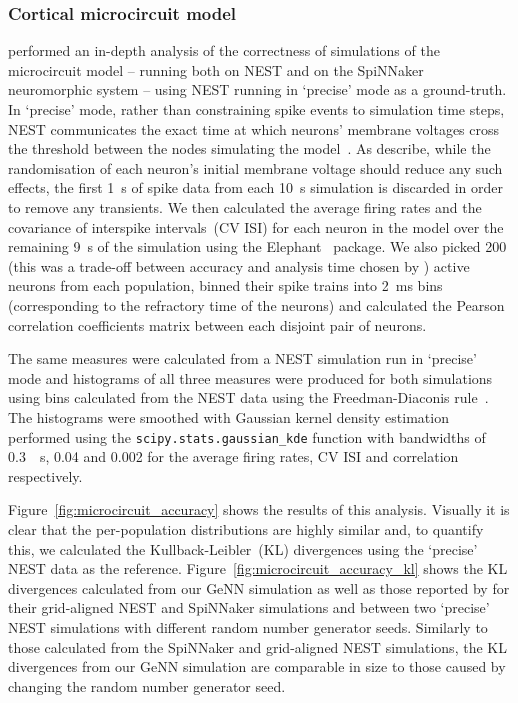 \documentclass[utf8]{frontiersSCNS} %
\begin{document}
\subsubsection{Cortical microcircuit model}
\citet{VanAlbada2018} performed an in-depth analysis of the correctness of simulations of the microcircuit model -- running both on NEST and on the SpiNNaker neuromorphic system -- using NEST running in `precise' mode as a ground-truth.
In `precise' mode, rather than constraining spike events to simulation time steps, NEST communicates the exact time at which neurons' membrane voltages cross the threshold between the nodes simulating the model~\citep{Hanuschkin2010}.
As \citeauthor{VanAlbada2018} describe, while the randomisation of each neuron's initial membrane voltage should reduce any such effects, the first \SI{1}{\second} of spike data from each \SI{10}{\second} simulation is discarded in order to remove any transients.
We then calculated the average firing rates and the covariance of interspike intervals~(CV ISI) for each neuron in the model over the remaining \SI{9}{\second} of the simulation using the Elephant~\citep{Yegenoglu2018} package.
We also picked \num{200} (this was a trade-off between accuracy and analysis time chosen by \citeauthor{VanAlbada2018}) active neurons from each population, binned their spike trains into \SI{2}{\milli\second} bins (corresponding to the refractory time of the neurons) and calculated the Pearson correlation coefficients matrix between each disjoint pair of neurons.

The same measures were calculated from a NEST simulation run in `precise' mode and histograms of all three measures were produced for both simulations using bins calculated from the NEST data using the Freedman-Diaconis rule~\citep{Freedman1981}.
The histograms were smoothed with Gaussian kernel density estimation performed using the \lstinline{scipy.stats.gaussian_kde} function with bandwidths of \SI{0.3}{\per\second}, \num{0.04} and \num{0.002} for the average firing rates, CV ISI and correlation respectively.

Figure~\ref{fig:microcircuit_accuracy} shows the results of this analysis.
Visually it is clear that the per-population distributions are highly similar and, to quantify this, we calculated the Kullback-Leibler~(KL) divergences using the `precise' NEST data as the reference.
Figure~\ref{fig:microcircuit_accuracy_kl} shows the KL divergences calculated from our GeNN simulation as well as those reported by \citet{VanAlbada2018} for their grid-aligned NEST and SpiNNaker simulations and between two `precise' NEST simulations with different random number generator seeds. 
Similarly to those calculated from the SpiNNaker and grid-aligned NEST simulations, the KL divergences from our GeNN simulation are comparable in size to those caused by changing the random number generator seed.
\end{document}
